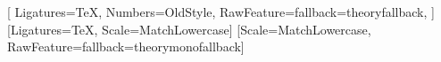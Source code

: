 %
%

\usepackage{iftex}
\RequireLuaTeX

\usepackage{fontspec}



\setmainfont{Charis SIL}[
  Ligatures=TeX,
  Numbers=OldStyle,
  RawFeature={fallback=theoryfallback},
]
\setsansfont{DejaVu Sans}[Ligatures=TeX, Scale=MatchLowercase]
\setmonofont{DejaVu Sans Mono}[Scale=MatchLowercase, RawFeature={fallback=theorymonofallback}]

\usepackage[eulerchapternumbers, listings, style=linedheaders,
pdfspacing]{classicthesis}

